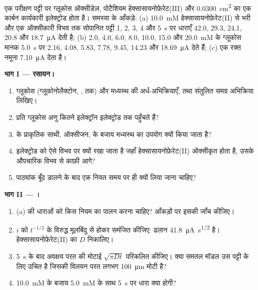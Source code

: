 \begin{problem}
\label{pb:b3:electrode-kinetics:1}
एक परीक्षण पट्टी पर ग्लूकोस ऑक्सीडेज़, पोटैशियम हेक्सासायनोफ़ेरेट(III) और
\qty{0.0300}{cm^2} का एक कार्बन कार्यकारी इलेक्ट्रोड होता है। समस्या के आँकड़े: (a) \qty{10.0}{mM}
हेक्सासायनोफ़ेरेट(II) से भरी और एक ऑक्सीकारी विभव तक सोपानित पट्टी
1, 2, 3, 4 और \qty{5}{s} पर धाराएँ 42.0, 29.3, 24.1, 20.8 और \qty{18.7}{\micro A} देती है;
(b) 2.0, 4.0, 6.0, 8.0, 10.0, 15.0 और \qty{20.0}{mM} के ग्लूकोस मानक
\qty{5.0}{s} पर 2.16, 4.08, 5.83, 7.78, 9.45, 14.23 और \qty{18.69}{\micro A} देते हैं; (c) एक रक्त नमूना
\qty{7.10}{\micro A} देता है।

\medskip\noindent\textbf{भाग I --- रसायन।}
\begin{enumerate}
  \item ग्लूकोस (ग्लूकोनोलैक्टोन, , तक) और मध्यस्थ की अर्ध-अभिक्रियाएँ,
        तथा संतुलित समग्र अभिक्रिया लिखिए।
  \item प्रति ग्लूकोस अणु कितने इलेक्ट्रॉन इलेक्ट्रोड तक पहुँचते हैं?
  \item {} के प्राकृतिक साथी, ऑक्सीजन, के बजाय मध्यस्थ का उपयोग
        क्यों किया जाता है?
  \item इलेक्ट्रोड को ऐसे विभव पर क्यों रखा जाता है जहाँ हेक्सासायनोफ़ेरेट(II)
        ऑक्सीकृत होता है, उसके औपचारिक विभव से काफ़ी आगे?
  \item पाठ्यांक बूँद डालने के बाद एक नियत समय पर ही क्यों
        लिया जाना चाहिए?
\end{enumerate}

\medskip\noindent\textbf{भाग II --- ।}
\begin{enumerate}[resume]
  \item (a) की धाराओं को किस नियम का पालन करना चाहिए? आँकड़ों पर इसकी जाँच कीजिए।
  \item $i$ को $t^{-1/2}$ के विरुद्ध मूलबिंदु से होकर समंजित कीजिए: ढलान \qty{41.8}{\micro A.s^{1/2}} है। हेक्सासायनोफ़ेरेट(II)
        का $D$ निकालिए।
  \item \qty{5}{s} के बाद अवक्षय परत की मोटाई $\sqrt{\pi Dt}$ परिकलित कीजिए। क्या
        समतल मॉडल उस पट्टी के लिए उचित है जिसकी विलयन परत लगभग
        \qty{100}{\micro m} मोटी है?
  \item \qty{10.0}{mM} के बजाय \qty{5.0}{mM} के साथ \qty{5}{s} पर धारा क्या होगी?
\end{enumerate}


\end{problem}
